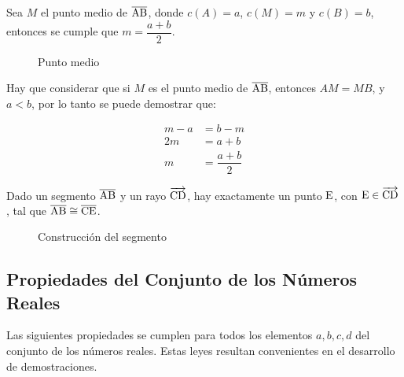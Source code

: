\begin{theorem}
    Sea $M$ el punto medio de $\overline{\rm AB}$, donde $c(A) = a$, $c(M) = m$ y $c(B) = b$, entonces se cumple que $m = \dfrac{a +b }{2}$.

    \begin{figure}[h]
        \centering
        
        \caption{Punto medio}
        \label{fig:plot6}
    \end{figure}
    

    Hay que considerar que si $M$ es el punto medio de $\overline{\rm AB}$, entonces $AM = MB$, y $a < b$, por lo tanto se puede demostrar que:

    \begin{equation*}
        \begin{split}
            m - a &= b - m \\
            2m &= a + b \\
            m &= \dfrac{a + b}{2}
        \end{split}
    \end{equation*}
\end{theorem}

\clearpage

\begin{theorem}
    Dado un segmento $\overline{\rm AB}$ y un rayo $\overrightarrow{\rm CD}$, hay exactamente un punto $\rm E$, con $\rm E \in \overrightarrow{\rm CD}$, tal que $\overline{\rm AB} \cong \overline{\rm CE}$.   

    \begin{figure}[h]
        \centering
        
        \caption{Construcción del segmento}
        \label{fig:plot10}
    \end{figure}
    
\end{theorem}

\subsection{Propiedades del Conjunto de los Números Reales}

Las siguientes propiedades se cumplen para todos los elementos $a,b,c,d$ del conjunto de los números reales. Estas leyes resultan convenientes en el desarrollo de demostraciones.

\vspace{0.5em}

